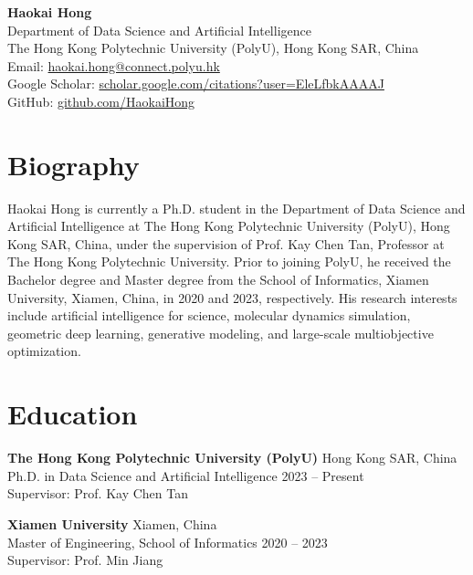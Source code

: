 \documentclass[11pt,a4paper]{article}
\begin{document}
\begin{center}
    {\LARGE \textbf{Haokai Hong}}\\[0.4em]
    
    Department of Data Science and Artificial Intelligence\\
    The Hong Kong Polytechnic University (PolyU), Hong Kong SAR, China\\[0.3em]
    
    Email: \href{mailto:haokai.hong@connect.polyu.hk}{haokai.hong@connect.polyu.hk}\\
    Google Scholar: \href{https://scholar.google.com/citations?user=EleLfbkAAAAJ&hl=en&oi=ao}{scholar.google.com/citations?user=EleLfbkAAAAJ}\\
    GitHub: \href{https://github.com/HaokaiHong}{github.com/HaokaiHong}
\end{center}

\vspace{0.8em}

\section*{Biography}

Haokai Hong is currently a Ph.D. student in the Department of Data Science and Artificial Intelligence at The Hong Kong Polytechnic University (PolyU), Hong Kong SAR, China, under the supervision of Prof. Kay Chen Tan, Professor at The Hong Kong Polytechnic University. Prior to joining PolyU, he received the Bachelor degree and Master degree from the School of Informatics, Xiamen University, Xiamen, China, in 2020 and 2023, respectively. His research interests include artificial intelligence for science, molecular dynamics simulation, geometric deep learning, generative modeling, and large-scale multiobjective optimization.

\section*{Education}

\textbf{The Hong Kong Polytechnic University (PolyU)} \hfill Hong Kong SAR, China\\
Ph.D. in Data Science and Artificial Intelligence \hfill 2023 -- Present\\
Supervisor: Prof. Kay Chen Tan

\vspace{0.5em}

\noindent\textbf{Xiamen University} \hfill Xiamen, China\\
Master of Engineering, School of Informatics \hfill 2020 -- 2023\\
Supervisor: Prof. Min Jiang
\end{document}
